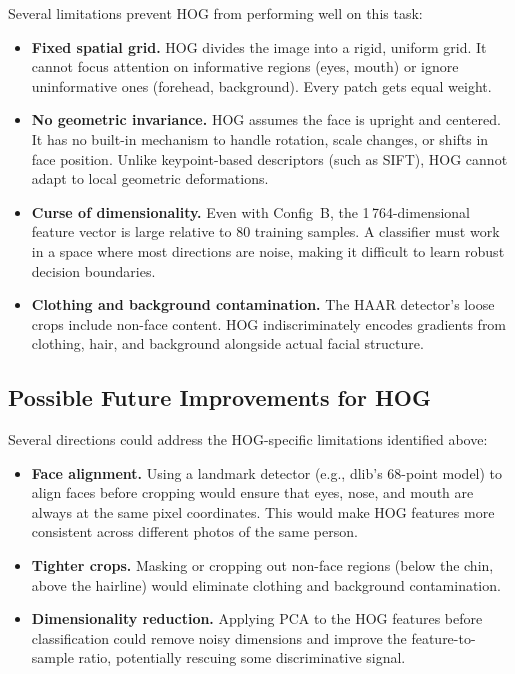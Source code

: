 \documentclass[a4paper,10pt]{article}
\begin{document}
Several limitations prevent HOG from performing well on this task:

\begin{itemize}
    \item \textbf{Fixed spatial grid.} HOG divides the image into a rigid, uniform grid. It cannot focus attention on informative regions (eyes, mouth) or ignore uninformative ones (forehead, background). Every patch gets equal weight.

    \item \textbf{No geometric invariance.} HOG assumes the face is upright and centered. It has no built-in mechanism to handle rotation, scale changes, or shifts in face position. Unlike keypoint-based descriptors (such as SIFT), HOG cannot adapt to local geometric deformations.

    \item \textbf{Curse of dimensionality.} Even with Config~B, the 1\,764-dimensional feature vector is large relative to 80 training samples. A classifier must work in a space where most directions are noise, making it difficult to learn robust decision boundaries.

    \item \textbf{Clothing and background contamination.} The HAAR detector's loose crops include non-face content. HOG indiscriminately encodes gradients from clothing, hair, and background alongside actual facial structure.
\end{itemize}

\subsection{Possible Future Improvements for HOG}

Several directions could address the HOG-specific limitations identified above:

\begin{itemize}
    \item \textbf{Face alignment.} Using a landmark detector (e.g., dlib's 68-point model) to align faces before cropping would ensure that eyes, nose, and mouth are always at the same pixel coordinates. This would make HOG features more consistent across different photos of the same person.

    \item \textbf{Tighter crops.} Masking or cropping out non-face regions (below the chin, above the hairline) would eliminate clothing and background contamination.

    \item \textbf{Dimensionality reduction.} Applying PCA to the HOG features before classification could remove noisy dimensions and improve the feature-to-sample ratio, potentially rescuing some discriminative signal.
\end{itemize}
\end{document}
